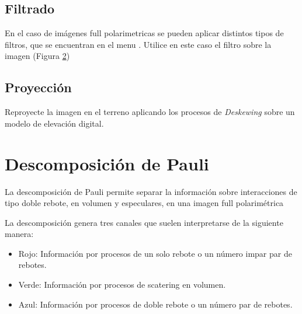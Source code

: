 \begin{figure}[h!]
    \centering
    \hfill
    \caption{}
    \label{fig:t3}
\end{figure}

\subsection{Filtrado}

En el caso de imágenes full polarimetricas se pueden aplicar distintos tipos de filtros, que se encuentran en el menu . Utilice en este caso el filtro  sobre la imagen  (Figura \ref{fig:plee})

\begin{figure}[h!]
    \centering
    \hfill
    \caption{}
    \label{fig:plee}
\end{figure}

\subsection{Proyección}

Reproyecte la imagen en el terreno aplicando los procesos de \emph{Deskewing} sobre un modelo de elevación digital.

\section{Descomposición de Pauli}

La descomposición de Pauli permite separar la información sobre interacciones de tipo doble rebote, en volumen y especulares, en una imagen full polarimétrica

La descomposición genera tres canales que suelen interpretarse de la siguiente manera:

\begin{itemize}
    \item Rojo: Información por procesos de un solo rebote o un número impar par de rebotes.
    \item Verde: Información por procesos de scatering en volumen.
    \item Azul: Información por procesos de doble rebote o un número par de rebotes.
\end{itemize}

